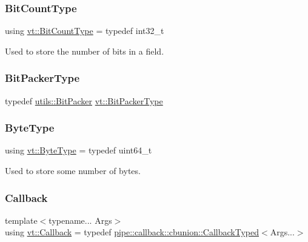 \mbox{\label{namespacevt_acaf7da00eb37dfb0c3479a6a982c30ef}} 
\subsubsection{\texorpdfstring{Bit\+Count\+Type}{BitCountType}}
{\footnotesize\ttfamily using \hyperlink{namespacevt_acaf7da00eb37dfb0c3479a6a982c30ef}{vt\+::\+Bit\+Count\+Type} = typedef int32\+\_\+t}



Used to store the number of bits in a field. 

\mbox{\label{namespacevt_a80d5091925c65efd88ca7f49fe1d633b}} 
\subsubsection{\texorpdfstring{Bit\+Packer\+Type}{BitPackerType}}
{\footnotesize\ttfamily typedef \hyperlink{structvt_1_1utils_1_1_bit_packer}{utils\+::\+Bit\+Packer} \hyperlink{namespacevt_a80d5091925c65efd88ca7f49fe1d633b}{vt\+::\+Bit\+Packer\+Type}}

\mbox{\label{namespacevt_aab8d55968084610ce3b17057981e9300}} 
\subsubsection{\texorpdfstring{Byte\+Type}{ByteType}}
{\footnotesize\ttfamily using \hyperlink{namespacevt_aab8d55968084610ce3b17057981e9300}{vt\+::\+Byte\+Type} = typedef uint64\+\_\+t}



Used to store some number of bytes. 

\mbox{\label{namespacevt_a57b238783d05de96bc2c4027f7073b7f}} 
\subsubsection{\texorpdfstring{Callback}{Callback}}
{\footnotesize\ttfamily template$<$typename... Args$>$ \\
using \hyperlink{namespacevt_a57b238783d05de96bc2c4027f7073b7f}{vt\+::\+Callback} = typedef \hyperlink{structvt_1_1pipe_1_1callback_1_1cbunion_1_1_callback_typed}{pipe\+::callback\+::cbunion\+::\+Callback\+Typed}$<$Args...$>$}

